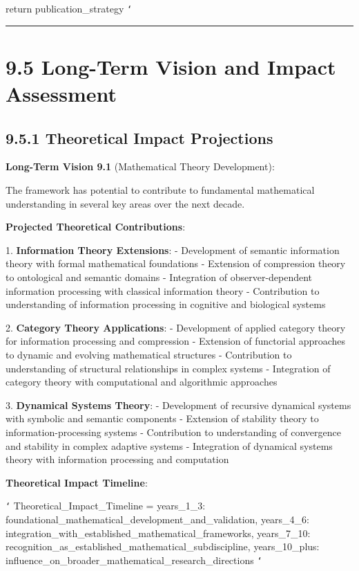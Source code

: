         return publication_strategy
\texttt{`}

\hrule

\section{9.5 Long-Term Vision and Impact Assessment}

\subsection{9.5.1 Theoretical Impact Projections}

\textbf{Long-Term Vision 9.1} (Mathematical Theory Development):

The framework has potential to contribute to fundamental mathematical understanding in several key areas over the next decade.

\textbf{Projected Theoretical Contributions}:

1. \textbf{Information Theory Extensions}:
   - Development of semantic information theory with formal mathematical foundations
   - Extension of compression theory to ontological and semantic domains
   - Integration of observer-dependent information processing with classical information theory
   - Contribution to understanding of information processing in cognitive and biological systems

2. \textbf{Category Theory Applications}:
   - Development of applied category theory for information processing and compression
   - Extension of functorial approaches to dynamic and evolving mathematical structures
   - Contribution to understanding of structural relationships in complex systems
   - Integration of category theory with computational and algorithmic approaches

3. \textbf{Dynamical Systems Theory}:
   - Development of recursive dynamical systems with symbolic and semantic components
   - Extension of stability theory to information-processing systems
   - Contribution to understanding of convergence and stability in complex adaptive systems
   - Integration of dynamical systems theory with information processing and computation

\textbf{Theoretical Impact Timeline}:

\texttt{`}
Theoretical_Impact_Timeline = {
    years_1_3: foundational_mathematical_development_and_validation,
    years_4_6: integration_with_established_mathematical_frameworks,
    years_7_10: recognition_as_established_mathematical_subdiscipline,
    years_10_plus: influence_on_broader_mathematical_research_directions
}
\texttt{`}


